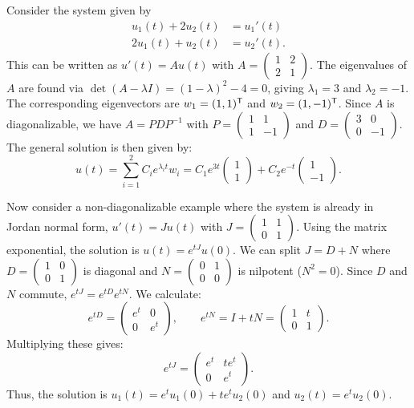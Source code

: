 \begin{example}
\label{ex:ode_matrix_exponential}
Consider the system given by
\begin{align*}
    u_1(t) + 2u_2(t) &= u_1'(t) \\
    2u_1(t) + u_2(t) &= u_2'(t).
\end{align*}
This can be written as $u'(t) = A u(t)$ with $A = \begin{pmatrix} 1 & 2 \\ 2 & 1 \end{pmatrix}$.
The eigenvalues of $A$ are found via $\det(A - \lambda I) = (1-\lambda)^2 - 4 = 0$, giving $\lambda_1 = 3$ and $\lambda_2 = -1$.
The corresponding eigenvectors are $w_1 = (1, 1)^{\mathsf{T}}$ and $w_2 = (1, -1)^{\mathsf{T}}$.
Since $A$ is diagonalizable, we have $A = P D P^{-1}$ with $P = \begin{pmatrix} 1 & 1 \\ 1 & -1 \end{pmatrix}$ and $D = \begin{pmatrix} 3 & 0 \\ 0 & -1 \end{pmatrix}$.
The general solution is then given by:
\[u(t) = \sum_{i=1}^2 C_i e^{\lambda_i t} w_i = C_1 e^{3t} \begin{pmatrix} 1 \\ 1 \end{pmatrix} + C_2 e^{-t} \begin{pmatrix} 1 \\ -1 \end{pmatrix}.\]

Now consider a non-diagonalizable example where the system is already in Jordan normal form, $u'(t) = J u(t)$ with $J = \begin{pmatrix} 1 & 1 \\ 0 & 1 \end{pmatrix}$.
Using the matrix exponential, the solution is $u(t) = e^{tJ} u(0)$.
We can split $J = D + N$ where $D = \begin{pmatrix} 1 & 0 \\ 0 & 1 \end{pmatrix}$ is diagonal and $N = \begin{pmatrix} 0 & 1 \\ 0 & 0 \end{pmatrix}$ is nilpotent ($N^2 = 0$).
Since $D$ and $N$ commute, $e^{tJ} = e^{tD} e^{tN}$.
We calculate:
\[e^{tD} = \begin{pmatrix} e^t & 0 \\ 0 & e^t \end{pmatrix}, \qquad e^{tN} = I + tN = \begin{pmatrix} 1 & t \\ 0 & 1 \end{pmatrix}.\]
Multiplying these gives:
\[e^{tJ} = \begin{pmatrix} e^t & t e^t \\ 0 & e^t \end{pmatrix}.\]
Thus, the solution is $u_1(t) = e^t u_1(0) + t e^t u_2(0)$ and $u_2(t) = e^t u_2(0)$.
\end{example}

